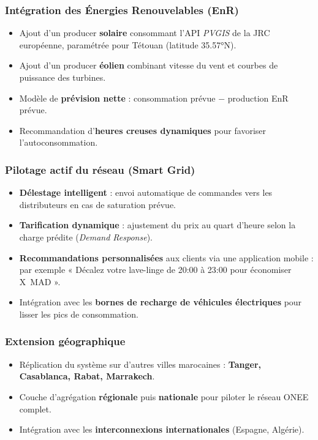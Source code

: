 \documentclass[11pt,a4paper]{article}
\begin{document}
\subsubsection{Intégration des Énergies Renouvelables (EnR)}
\begin{itemize}
  \item Ajout d'un producer \textbf{solaire} consommant l'API \emph{PVGIS} de la JRC européenne, paramétrée pour Tétouan (latitude 35.57°N).
  \item Ajout d'un producer \textbf{éolien} combinant vitesse du vent et courbes de puissance des turbines.
  \item Modèle de \textbf{prévision nette} : consommation prévue $-$ production EnR prévue.
  \item Recommandation d'\textbf{heures creuses dynamiques} pour favoriser l'autoconsommation.
\end{itemize}

\subsubsection{Pilotage actif du réseau (Smart Grid)}
\begin{itemize}
  \item \textbf{Délestage intelligent} : envoi automatique de commandes vers les distributeurs en cas de saturation prévue.
  \item \textbf{Tarification dynamique} : ajustement du prix au quart d'heure selon la charge prédite (\emph{Demand Response}).
  \item \textbf{Recommandations personnalisées} aux clients via une application mobile : par exemple « Décalez votre lave-linge de 20:00 à 23:00 pour économiser X~MAD ».
  \item Intégration avec les \textbf{bornes de recharge de véhicules électriques} pour lisser les pics de consommation.
\end{itemize}

\subsubsection{Extension géographique}
\begin{itemize}
  \item Réplication du système sur d'autres villes marocaines : \textbf{Tanger, Casablanca, Rabat, Marrakech}.
  \item Couche d'agrégation \textbf{régionale} puis \textbf{nationale} pour piloter le réseau ONEE complet.
  \item Intégration avec les \textbf{interconnexions internationales} (Espagne, Algérie).
\end{itemize}
\end{document}
